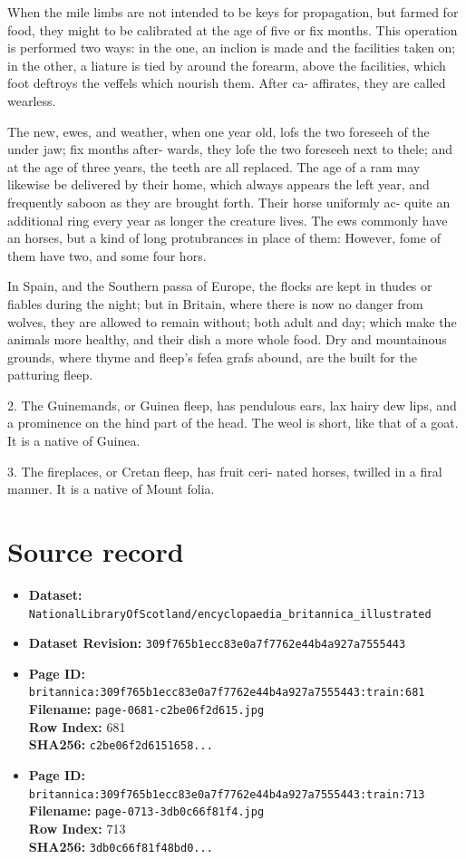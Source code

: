 \documentclass{article}
\begin{document}
When the mile limbs are not intended to be keys for propagation, but farmed for food, they might to be calibrated at the age of five or fix months. This operation is performed two ways: in the one, an inclion is made and the facilities taken on; in the other, a liature is tied by around the forearm, above the facilities, which foot deftroys the veffels which nourish them. After ca- affirates, they are called wearless.

The new, ewes, and weather, when one year old, lofs the two foreseeh of the under jaw; fix months after- wards, they lofe the two foreseeh next to thele; and at the age of three years, the teeth are all replaced. The age of a ram may likewise be delivered by their home, which always appears the left year, and frequently saboon as they are brought forth. Their horse uniformly ac- quite an additional ring every year as longer the creature lives. The ews commonly have an horses, but a kind of long protubrances in place of them: However, fome of them have two, and some four hors.

In Spain, and the Southern passa of Europe, the flocks are kept in thudes or fiables during the night; but in Britain, where there is now no danger from wolves, they are allowed to remain without; both adult and day; which make the animals more healthy, and their dish a more whole food. Dry and mountainous grounds, where thyme and fleep's fefea grafs abound, are the built for the patturing fleep.

2. The Guinemands, or Guinea fleep, has pendulous ears, lax hairy dew lips, and a prominence on the hind part of the head. The weol is short, like that of a goat. It is a native of Guinea.

3. The fireplaces, or Cretan fleep, has fruit ceri- nated horses, twilled in a firal manner. It is a native of Mount folia.



\section*{Source record}
\begin{itemize}
\item \textbf{Dataset:} \texttt{NationalLibraryOfScotland/encyclopaedia\_britannica\_illustrated}
\item \textbf{Dataset Revision:} \texttt{309f765b1ecc83e0a7f7762e44b4a927a7555443}
\item \textbf{Page ID:} \texttt{britannica:309f765b1ecc83e0a7f7762e44b4a927a7555443:train:681} \\
  \textbf{Filename:} \texttt{page-0681-c2be06f2d615.jpg} \\
  \textbf{Row Index:} 681 \\
  \textbf{SHA256:} \texttt{c2be06f2d6151658...}
\item \textbf{Page ID:} \texttt{britannica:309f765b1ecc83e0a7f7762e44b4a927a7555443:train:713} \\
  \textbf{Filename:} \texttt{page-0713-3db0c66f81f4.jpg} \\
  \textbf{Row Index:} 713 \\
  \textbf{SHA256:} \texttt{3db0c66f81f48bd0...}
\end{itemize}
\end{document}
